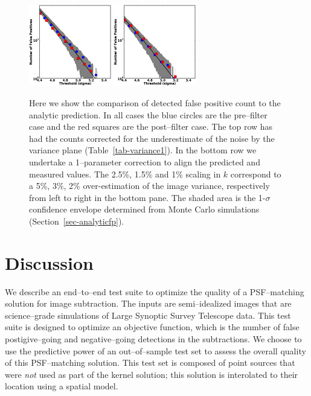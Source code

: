 \documentclass[floatfix, apj]{emulateapj}
\begin{document}
\begin{figure}[!ht]
  \includegraphics[width=0.32\textwidth]{fig4e.eps}
  \includegraphics[width=0.32\textwidth]{fig4f.eps} \\
  \caption{Here we show the comparison of detected false positive
    count to the analytic prediction.
    In all cases the blue circles are the pre--filter case and the red
    squares are the post--filter case.
    The top row has had the counts corrected for the underestimate of
    the noise by the variance plane (Table~\ref{tab-variance1}).
    In the bottom row we undertake a 1--parameter correction to align
    the predicted and measured values.
    The 2.5\%, 1.5\% and 1\% scaling in $k$ correspond to a 5\%, 3\%,
    2\% over-estimation of the image variance, respectively from left
    to right in the bottom pane. 
    The shaded area is the 1-$\sigma$ confidence envelope determined
    from Monte Carlo simulations (Section~\ref{sec-analyticfp}).}
\label{fig:4}
\end{figure}

\section{Discussion}

We describe an end--to--end test suite to optimize the quality of a PSF--matching solution for image subtraction.
The inputs are semi--idealized images that are science--grade simulations of Large Synoptic Survey Telescope data.
This test suite is designed to optimize an objective function, which is the number of false postigive--going and negative--going detections in the subtractions.
We choose to use the predictive power of an out--of--sample test set to assess the overall quality of this PSF--matching solution.
This test set is composed of point sources that were {\it not} used as part of the kernel solution; this solution is interolated to their location using a spatial model.
\end{document}
